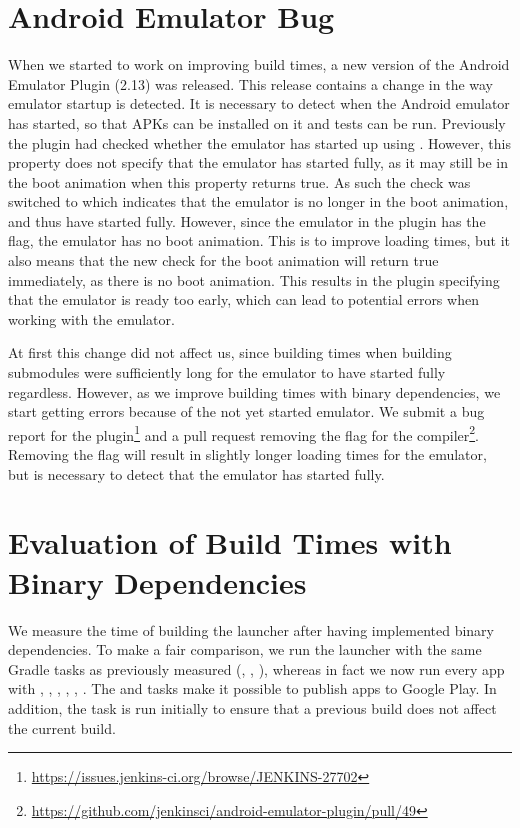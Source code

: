 \section{Android Emulator Bug}\label{sec:emulator_bug}
When we started to work on improving build times, a new version of the Android Emulator Plugin (2.13) was released. This release contains a change in the way emulator startup is detected. It is necessary to detect when the Android emulator has started, so that APKs can be installed on it and tests can be run. Previously the plugin had checked whether the emulator has started up using . However, this property does not specify that the emulator has started fully, as it may still be in the boot animation when this property returns true. As such the check was switched to   which indicates that the emulator is no longer in the boot animation, and thus have started fully. However, since the emulator in the plugin has the  flag, the emulator has no boot animation. This is to improve loading times, but it also means that the new check for the boot animation will return true immediately, as there is no boot animation. This results in the plugin specifying that the emulator is ready too early, which can lead to potential errors when working with the emulator.

At first this change did not affect us, since building times when building submodules were sufficiently long for the emulator to have started fully regardless. However, as we improve building times with binary dependencies, we start getting errors because of the not yet started emulator. We submit a bug report for the plugin\footnote{\url{https://issues.jenkins-ci.org/browse/JENKINS-27702}} and a pull request removing the  flag for the compiler\footnote{\url{https://github.com/jenkinsci/android-emulator-plugin/pull/49}}. Removing the  flag will result in slightly longer loading times for the emulator, but is necessary to detect that the emulator has started fully.

\section{Evaluation of Build Times with Binary Dependencies}\label{sec:faster_build_evaluation}
We measure the time of building the launcher after having implemented binary dependencies. To make a fair comparison, we run the launcher with the same Gradle tasks as previously measured (, , ), whereas in fact we now run every app with , , , , , . The  and  tasks make it possible to publish apps to Google Play. In addition, the  task is run initially to ensure that a previous build does not affect the current build.

